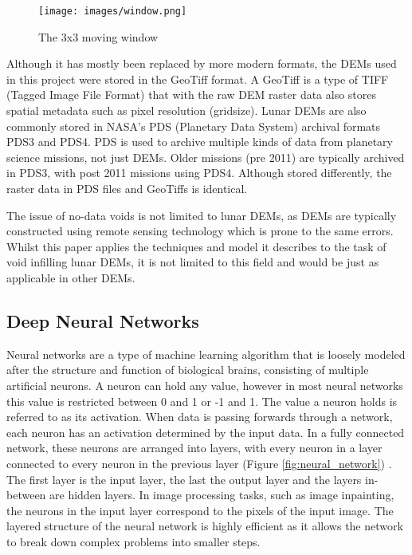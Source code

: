 \documentclass[twocolumn]{article}
\begin{document}
\begin{figure}[htbp]
\centering
\texttt{[image: images/window.png]}
\caption{\label{fig:window}The 3x3 moving window\autocite{qiuVoidFillingDigital2019}}
\end{figure}

Although it has mostly been replaced by more modern formats, the DEMs used in this project were stored in the GeoTiff format.
A GeoTiff is a type of TIFF (Tagged Image File Format) that with the raw DEM raster data also stores spatial metadata such as pixel resolution (gridsize).
Lunar DEMs are also commonly stored in NASA's PDS (Planetary Data System) archival formats PDS3 and PDS4.
PDS is used to archive multiple kinds of data from planetary science missions, not just DEMs.
Older missions (pre 2011) are typically archived in PDS3, with post 2011 missions using PDS4.
Although stored differently, the raster data in PDS files and GeoTiffs is identical.

The issue of no-data voids is not limited to lunar DEMs, as DEMs are typically constructed using remote sensing technology which is prone to the same errors.
Whilst this paper applies the techniques and model it describes to the task of void infilling lunar DEMs, it is not limited to this field and would be just as applicable in other DEMs.

\subsection{Deep Neural Networks}
\label{sec:orge77177a}

Neural networks are a type of machine learning algorithm that is loosely modeled after the structure and function of biological brains, consisting of multiple artificial neurons\autocite{grossiIntroductionArtificialNeural2008}.
A neuron can hold any value, however in most neural networks this value is restricted between 0 and 1 or -1 and 1.
The value a neuron holds is referred to as its activation.
When data is passing forwards through a network, each neuron has an activation determined by the input data.
In a fully connected network, these neurons are arranged into layers, with every neuron in a layer connected to every neuron in the previous layer (Figure \ref{fig:neural_network}) .
The first layer is the input layer, the last the output layer and the layers in-between are hidden layers.
In image processing tasks, such as image inpainting, the neurons in the input layer correspond to the pixels of the input image.
The layered structure of the neural network is highly efficient as it allows the network to break down complex problems into smaller steps.
\end{document}
